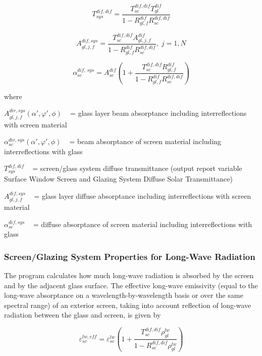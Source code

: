 \begin{equation}
T_{sys}^{dif,dif} = \frac{{T_{sc}^{dif,dif}T_{gl}^{dif}}}{{1 - R_{gl,f}^{dif}R_{sc}^{dif,dif}}}
\end{equation}

\begin{equation}
A_{gl,j,f}^{dif,sys} = \frac{{T_{sc}^{dif,dif}A_{gl,j,f}^{dif}}}{{1 - R_{gl,f}^{dif}R_{sc}^{dif,dif}}},\;j = 1,N
\end{equation}

\begin{equation}
\alpha_{sc}^{dif,\,sys} = A_{sc}^{dif}\left( {1 + \frac{{T_{sc}^{dif,dif}R_{gl,f}^{dif}}}{{1 - R_{gl,f}^{dif}R_{sc}^{dif,dif}}}} \right)
\end{equation}

where

\(A_{gl,j,f}^{dir,sys}\left( {\alpha ',\varphi ',\phi } \right)\) ~ = glass layer beam absorptance including interreflections with screen material

\(\alpha_{sc}^{dir,sys}\left( {\alpha ',\varphi ',\phi } \right)\) ~ = beam absorptance of screen material including interreflections with glass

\(T_{sys}^{dif,dif}\) ~ = screen/glass system diffuse transmittance (output report variable Surface Window Screen and Glazing System Diffuse Solar Transmittance)

\(A_{gl,j,f}^{dif,sys}\) ~ = glass layer diffuse absorptance including interreflections with screen material

\(\alpha_{sc}^{dif,sys}\) ~ = diffuse absorptance of screen material including interreflections with glass

\subsubsection{Screen/Glazing System Properties for Long-Wave Radiation}\label{screenglazing-system-properties-for-long-wave-radiation}

The program calculates how much long-wave radiation is absorbed by the screen and by the adjacent glass surface. The effective long-wave emissivity (equal to the long-wave absorptance on a wavelength-by-wavelength basis or over the same spectral range) of an exterior screen, taking into account reflection of long-wave radiation between the glass and screen, is given by

\begin{equation}
\varepsilon_{sc}^{lw,eff} = \varepsilon_{sc}^{lw}\left( {1 + \frac{{T_{sc}^{dif,dif}\rho_{gl}^{lw}}}{{1 - R_{sc}^{dif,dif}\rho_{gl}^{lw}}}} \right)
\end{equation}

